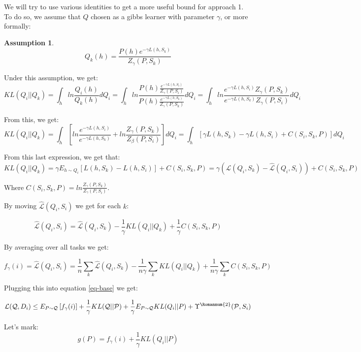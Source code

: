 \documentclass[letterpaper]{article}
\theoremstyle{definition}
\newtheorem{assumption}{Assumption}
\begin{document}
We will try to use various identities to get a more useful bound for approach 1. To do so, we assume that $Q$ chosen as a gibbs learner with parameter $\gamma$, or more formally:

\begin{assumption} \label{assumption-gibbs}
	$$Q_k(h) = \frac{P(h)e^{-\gamma L(h, S_k)}}{Z_{\gamma}(P, S_k)}$$
\end{assumption}

Under this assumption, we get: $$KL(Q_i||Q_k)=\int_h ln\frac{Q_i(h)}{Q_k(h)}dQ_i=\int_h ln\frac{P(h)\frac{e^{-\gamma L(h,S_i)}}{Z_{\gamma}(P,S_i)}}{P(h)\frac{e^{-\gamma L(h,S_k)}}{Z_{\gamma}(P,S_k)}}dQ_i=\int_h ln\frac{e^{-\gamma L(h,S_i)} Z_{\gamma}(P,S_k)}{e^{-\gamma L(h,S_k)} Z_{\gamma}(P,S_i)}dQ_i$$

From this, we get: 
$$KL(Q_i||Q_k)=\int_h \left [ ln\frac{e^{-\gamma L(h,S_i)}}{e^{-\gamma L(h,S_k)} }+ln \frac{Z_{\gamma}(P,S_k)}{Z_{\beta}(P,S_i)} \right ] dQ_i=\int_h \left [ \gamma L(h,S_k)-\gamma L(h,S_i) +C(S_i,S_k,P) \right ] dQ_i$$

From this last expression, we get that:
$$KL(Q_i||Q_k)=\gamma E_{h\sim Q_i}[L(h,S_k)-L(h,S_i)]+C(S_i,S_k,P)=\gamma (\hat{\mathcal{L}}(Q_i,S_k)-\hat{\mathcal{L}}(Q_i,S_i))+C(S_i,S_k,P)$$

Where $C(S_i,S_k,P)=ln\frac{Z_{\gamma}(P,S_k)}{ Z_{\gamma}(P,S_i)}$.

By moving $\hat{\mathcal{L}}(Q_i,S_i)$ we get for each $k$:

$$ \hat{\mathcal{L}}(Q_i,S_i)= \hat{\mathcal{L}}(Q_i,S_k) - \frac{1}{\gamma} KL(Q_i||Q_k) + \frac{1}{\gamma}C(S_i,S_k,P)$$

By averaging over all tasks we get:

\begin{equation}
f_{\gamma}(i)=\hat{\mathcal{L}}(Q_i,S_i)= \frac{1}{n}\sum_k\hat{\mathcal{L}}(Q_i,S_k) - \frac{1}{n\gamma} \sum_k KL(Q_i||Q_k) + \frac{1}{n\gamma}\sum_k C(S_i,S_k,P)
\end{equation}

Plugging this into equation \ref{eq-base} we get:

\begin{equation}
\mathcal{L}(\mathcal{Q}, D_i)\leq E_{P\sim \mathcal{Q}} \left [ f_{\gamma}(i) \right ]+ \frac{1}{\gamma}KL(\mathcal{Q}||\mathcal{P})+\frac{1}{\gamma} E_{P\sim \mathcal{Q}}KL(Q_i||P)+\Upsilon^{\text{\Romannum{2}}}(\mathcal{P}, S_i)
\end{equation}

Let's mark:
$$g(P)=f_{\gamma}(i)+ \frac{1}{\gamma}KL(Q_i||P)$$
\end{document}
